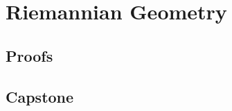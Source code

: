 \chapter{Riemannian Geometry}
\label{chap:riemannian-geometry}




\LRAExcludeFromPrintEditionBegin
\section*{Proofs}


\section*{Capstone}

\LRAExcludeFromPrintEditionEnd